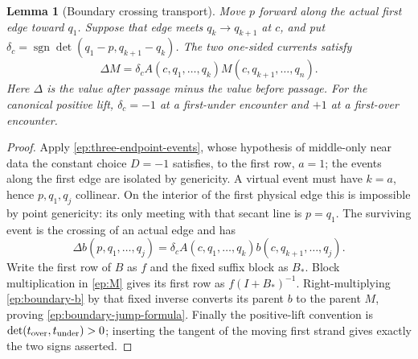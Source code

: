 \documentclass[11pt,letterpaper]{article}
\numberwithin{equation}{section}
\newtheorem{lemma}[theorem]{Lemma}
\theoremstyle{definition}
\theoremstyle{remark}
\DeclareMathOperator{\sgn}{sgn}
\begin{document}
\begin{lemma}[Boundary crossing transport]
\label{ep:boundary-jump}
Move $p$ forward along the actual first edge toward $q_1$.  Suppose that
edge meets $q_k\to q_{k+1}$ at $c$, and put
$\delta_c=\sgn\det(q_1-p,q_{k+1}-q_k)$.  The two one-sided currents
satisfy
\begin{equation}
 \Delta M=
 \delta_c A(c,q_1,\ldots,q_k)
 M(c,q_{k+1},\ldots,q_n).
 \label{ep:boundary-jump-formula}
\end{equation}
Here $\Delta$ is the value after passage minus the value before passage.
For the canonical positive lift, $\delta_c=-1$ at a first-under encounter
and $+1$ at a first-over encounter.
\end{lemma}
\begin{proof}
Apply \eqref{ep:three-endpoint-events}, whose hypothesis of middle-only
near data the constant choice $D=-1$ satisfies, to the first row, $a=1$;
the events along the first edge are isolated by genericity.
A virtual event must have $k=a$, hence $p,q_1,q_j$ collinear.
On the interior of the first physical edge this is impossible by point
genericity: its only meeting with that secant line is $p=q_1$.
The surviving event is the crossing of an actual edge and has
\begin{equation}
 \Delta b(p,q_1,\ldots,q_j)
 =\delta_c A(c,q_1,\ldots,q_k)
 b(c,q_{k+1},\ldots,q_j).
 \label{ep:boundary-b}
\end{equation}
Write the first row of $B$ as $f$ and the fixed suffix block as $B_*$.
Block multiplication in \eqref{ep:M} gives its first row as
$f(I+B_*)^{-1}$.  Right-multiplying \eqref{ep:boundary-b} by that fixed
inverse converts its parent $b$ to the parent $M$, proving
\eqref{ep:boundary-jump-formula}.  Finally the positive-lift convention is
$\det(t_{\rm over},t_{\rm under})>0$; inserting the tangent of the
moving first strand gives exactly the two signs asserted.
\end{proof}
\end{document}
